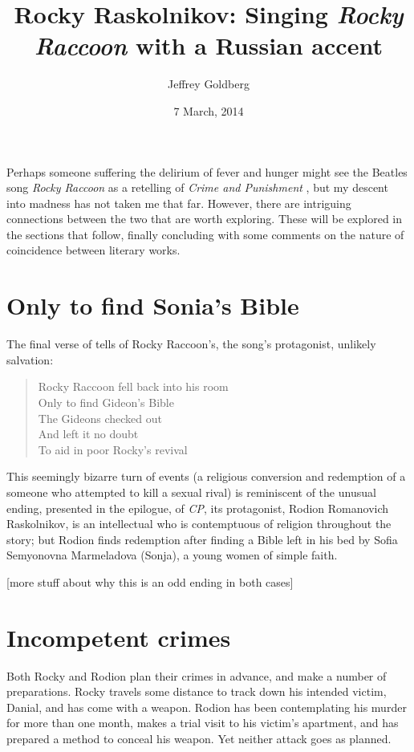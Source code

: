 \documentclass[russian,english]{mlaresearch}
\title{Rocky Raskolnikov: Singing \textit{Rocky Raccoon} with a Russian accent}
\author{Jeffrey Goldberg}
\date{7 March, 2014}
\begin{document}
\makemlatitle

Perhaps someone suffering the delirium of fever and hunger might see the
Beatles song \textit{Rocky Raccoon} \autocite{Beatles:RR} as a retelling of
\textit{Crime and Punishment} \autocite{Dostoyevsky:CP}, but my descent into
madness has not taken me that far. However, there are intriguing connections
between the two that are worth exploring. These will be explored in the
sections that follow, finally concluding with some comments on the nature of
coincidence between literary works.

\section{Only to find Sonia's Bible}

The final verse of \autocite{Beatles:RR} tells of Rocky Raccoon's, the song's protagonist, unlikely salvation:

\begin{verse}
Rocky Raccoon fell back into his room\\
Only to find Gideon's Bible\\
The Gideons checked out\\
And left it no doubt\\
To aid in poor Rocky's revival
\end{verse}

This seemingly bizarre turn of events (a religious conversion and redemption
of a someone who attempted to kill a sexual rival) is reminiscent of the
unusual ending, presented in the epilogue, of \textit{CP}, its protagonist,
Rodion Romanovich Raskolnikov, is an intellectual who is contemptuous of
religion throughout the story; but Rodion finds redemption after finding a
Bible left in his bed by Sofia Semyonovna Marmeladova (Sonja), a young women
of simple faith.

[more stuff about why this is an odd ending in both cases]

\section{Incompetent crimes}

Both Rocky and Rodion plan their crimes in advance, and make a number of preparations. Rocky travels some distance to track down his intended victim, Danial, and has come with a weapon. Rodion has been contemplating his murder for more than one month, makes a trial visit to his victim's apartment, and has prepared a method to conceal his weapon. Yet neither attack goes as planned.
\end{document}
